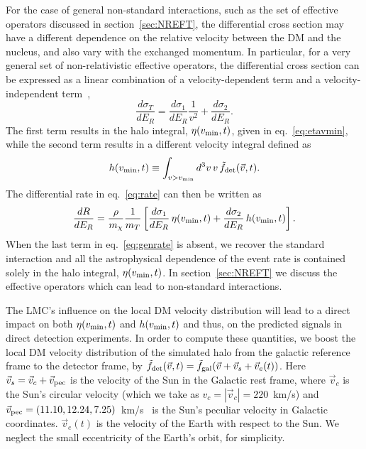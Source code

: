 \documentclass[a4paper,11pt]{article}
\begin{document}
For the case of general non-standard interactions, such as the set of effective operators discussed in section~\ref{sec:NREFT}, the differential cross section may have a different dependence on the relative velocity between the DM and the nucleus, and also vary with the exchanged momentum. In particular, for a very general set of non-relativistic effective operators, the differential cross section can be expressed as a linear combination of a velocity-dependent term and a velocity-independent term~\cite{Kahlhoefer:2017ddj, Cirelli:2013ufw},
\begin{equation}
\frac{d\sigma_T}{dE_R} = \frac{d\sigma_1}{dE_R}\frac{1}{v^2} + \frac{d\sigma_2}{dE_R}.
\label{eq:gencrosssection}
\end{equation}
The first term results in the halo integral, $\eta(v_{\rm min}, t)$, given in eq.~\eqref{eq:etavmin}, while the second term results in a different velocity integral defined as
\begin{equation}
    h(v_{\rm{min}},t) \equiv \int_{v>v_{\rm{min}}} d^3 v\, v\, \tilde{f}_{\rm{det}}({\vec v},t).
\label{eq:hvmin}
\end{equation}
%
The differential rate in eq.~\eqref{eq:rate} can then be written as
\begin{equation}
\frac{dR}{dE_R} = \frac{\rho}{m_\chi}\frac{1}{m_T} \left[ \frac{d\sigma_1}{dE_R}\,\eta (v_{\rm{min}}, t) + \frac{d\sigma_2}{dE_R}\,h(v_{\rm{min}}, t)\right].
\label{eq:genrate}
\end{equation} 
When the last term in eq.~\eqref{eq:genrate} is absent, we recover the standard interaction and all the astrophysical dependence of the event rate is contained solely in the halo integral, $\eta(v_{\rm{min}}, t)$. In section~\ref{sec:NREFT} we discuss the effective operators which can lead to non-standard interactions.



The LMC's influence on the local DM velocity distribution will lead to a direct impact on both $\eta(v_{\rm min}, t)$ and $h(v_{\rm min}, t)$ and thus, on the predicted signals in direct detection experiments. In order to compute these quantities, we boost the local DM velocity distribution of the simulated halo from the galactic reference frame to the detector frame, by $\tilde{f}_{\rm{det}}({\vec v},t)=\tilde{f}_{\rm{gal}}({\vec v} + {\vec v}_s + {\vec v}_e(t))$. Here ${\vec v}_s={\vec v}_c + {\vec v}_{\rm{pec}}$ is the velocity of the Sun in the Galactic rest frame, where $\vec v_c$ is the Sun's circular velocity (which we take as $v_c=|\vec v_c|=220$~km/s) and ${\vec v}_{\rm{pec}}=(11.10,12.24,7.25)$~km/s~\cite{2010MNRAS.403.1829S} is the Sun's peculiar velocity in Galactic coordinates. ${\vec v}_e(t)$ is the velocity of the Earth with respect to the Sun. We neglect the small eccentricity of the Earth's orbit, for simplicity.
\end{document}
